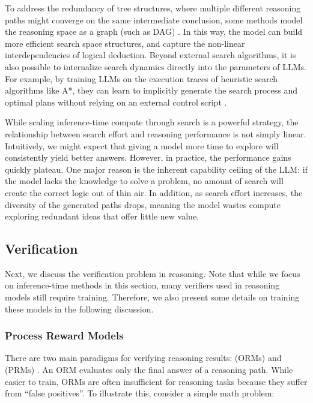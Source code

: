 To address the redundancy of tree structures, where multiple different reasoning paths might converge on the same intermediate conclusion, some methods model the reasoning space as a graph (such as DAG) \cite{zhang-etal:2025cumulative}. In this way, the model can build more efficient search space structures, and capture the non-linear interdependencies of logical deduction. Beyond external search algorithms, it is also possible to internalize search dynamics directly into the parameters of LLMs. For example, by training LLMs on the execution traces of heuristic search algorithms like A*, they can learn to implicitly generate the search process and optimal plans without relying on an external control script \cite{lehnert-etal:2025beyond}.

While scaling inference-time compute through search is a powerful strategy, the relationship between search effort and reasoning performance is not simply linear. Intuitively, we might expect that giving a model more time to explore will consistently yield better answers. However, in practice, the performance gains quickly plateau. One major reason is the inherent capability ceiling of the LLM: if the model lacks the knowledge to solve a problem, no amount of search will create the correct logic out of thin air. In addition, as search effort increases, the diversity of the generated paths drops, meaning the model wastes compute exploring redundant ideas that offer little new value.

\subsection{Verification}
\label{sec:reasoning-verification}

Next, we discuss the verification problem in reasoning. Note that while we focus on inference-time methods in this section, many verifiers used in reasoning models still require training. Therefore, we also present some details on training these models in the following discussion.

\subsubsection{Process Reward Models}

There are two main paradigms for verifying reasoning results:  (ORMs) and  (PRMs) \cite{uesato-etal:2022solving,lightman-etal:2024lets}. An ORM evaluates only the final answer of a reasoning path. While easier to train, ORMs are often insufficient for reasoning tasks because they suffer from ``false positives''. To illustrate this, consider a simple math problem:

